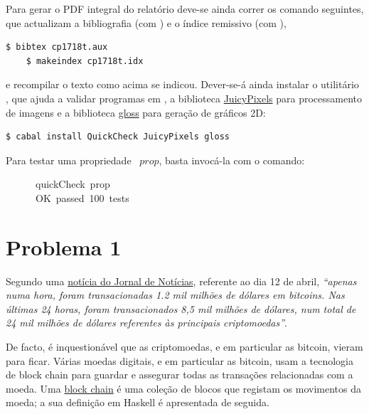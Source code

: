 \documentclass[a4paper]{article}
\newcommand{\Conid}[1]{\mathit{#1}}
\newcommand{\Varid}[1]{\mathit{#1}}
\def\resethooks{%
  \global\let\SaveRestoreHook\empty
  \global\let\ColumnHook\empty}
\let\hspre\empty
\let\hspost\empty
\begin{document}
Para gerar o PDF integral do relatório deve-se ainda correr os comando seguintes,
que actualizam a bibliografia (com \Bibtex) e o índice remissivo (com \Makeindex),
\begin{Verbatim}[fontsize=\small]
    $ bibtex cp1718t.aux
    $ makeindex cp1718t.idx
\end{Verbatim}
e recompilar o texto como acima se indicou. Dever-se-á ainda instalar o utilitário
\QuickCheck,
que ajuda a validar programas em \Haskell, a biblioteca
\href{https://hackage.haskell.org/package/JuicyPixels}{JuicyPixels} para processamento
de imagens e a biblioteca \href{http://gloss.ouroborus.net/}{gloss} para geração de gráficos 2D:
\begin{Verbatim}[fontsize=\small]
    $ cabal install QuickCheck JuicyPixels gloss
\end{Verbatim}
Para testar uma propriedade \QuickCheck~\ensuremath{\Varid{prop}}, basta invocá-la com o comando:
\begin{tabbing}\ttfamily
~~~~~~quickCheck~prop\\
\ttfamily ~~~~~~OK~passed~100~tests
\end{tabbing}

\section*{Problema 1}

Segundo uma \href{https://www.jn.pt/economia/interior/compra-diaria-de-bitcoins-iguala-acoes-da-apple-9257302.html}{notícia do Jornal de Notícias},
referente ao dia 12 de abril, \emph{``apenas numa hora, foram transacionadas 1.2 mil milhões de dólares em bitcoins. Nas últimas 24 horas, foram transacionados 8,5 mil milhões de dólares, num total de 24 mil milhões de dólares referentes às principais criptomoedas''}.

De facto, é inquestionável que as criptomoedas, e em particular as bitcoin, vieram para ficar.
%
Várias moedas digitais, e em particular as bitcoin, usam a tecnologia de block chain
para guardar e assegurar todas as transações relacionadas com a moeda.
%
Uma \href{https://en.bitcoin.it/wiki/Block_chain}{block chain} é uma coleção de blocos que registam os movimentos da moeda; a sua definição em Haskell é apresentada de seguida.

\resethooks
\end{document}
